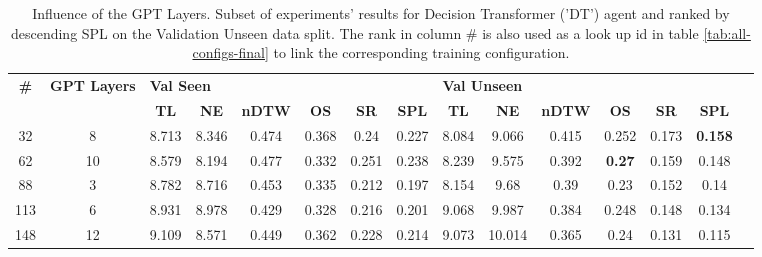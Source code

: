 \begin{table}
\centering
\caption{\label{tab:dt_layers}Influence of the GPT Layers. Subset of experiments' results for Decision Transformer ('DT') agent and ranked by descending SPL on the Validation Unseen data split. The rank in column \# is also used as a look up id in table \ref{tab:all-configs-final} to link the corresponding training configuration.}
\begin{tabular}{@{\hskip3pt}c@{\hskip3pt}c@{\hskip3pt}c@{\hskip3pt}c@{\hskip3pt}c@{\hskip3pt}c@{\hskip3pt}c@{\hskip3pt}c@{\hskip3pt}c@{\hskip3pt}c@{\hskip3pt}c@{\hskip3pt}c@{\hskip3pt}c@{\hskip3pt}c@{\hskip3pt}c}
\toprule
\textbf{\#} & \textbf{GPT Layers} & \multicolumn{6}{l}{\textbf{Val Seen}} & \multicolumn{6}{l}{\textbf{Val Unseen}} \\
 \textbf{~} &          \textbf{~} &       \textbf{TL} & \textbf{NE} & \textbf{nDTW} & \textbf{OS} & \textbf{SR} & \textbf{SPL} &         \textbf{TL} & \textbf{NE} & \textbf{nDTW} &    \textbf{OS} & \textbf{SR} &    \textbf{SPL} \\
\midrule
         32 &                   8 &             8.713 &       8.346 &         0.474 &       0.368 &        0.24 &        0.227 &               8.084 &       9.066 &         0.415 &          0.252 &       0.173 &  \textbf{0.158} \\
         62 &                  10 &             8.579 &       8.194 &         0.477 &       0.332 &       0.251 &        0.238 &               8.239 &       9.575 &         0.392 &  \textbf{0.27} &       0.159 &           0.148 \\
         88 &                   3 &             8.782 &       8.716 &         0.453 &       0.335 &       0.212 &        0.197 &               8.154 &        9.68 &          0.39 &           0.23 &       0.152 &            0.14 \\
        113 &                   6 &             8.931 &       8.978 &         0.429 &       0.328 &       0.216 &        0.201 &               9.068 &       9.987 &         0.384 &          0.248 &       0.148 &           0.134 \\
        148 &                  12 &             9.109 &       8.571 &         0.449 &       0.362 &       0.228 &        0.214 &               9.073 &      10.014 &         0.365 &           0.24 &       0.131 &           0.115 \\
\bottomrule
\end{tabular}
\end{table}
